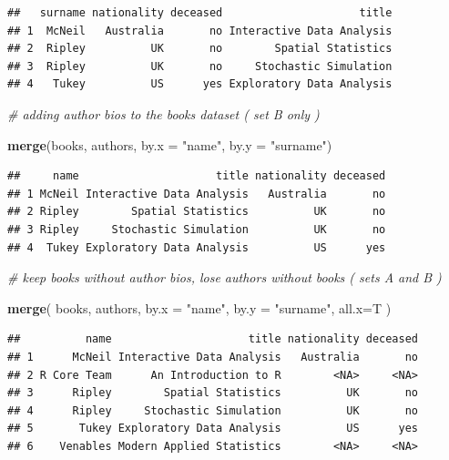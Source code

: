 \documentclass[]{book}
\newenvironment{Shaded}{\begin{snugshade}}{\end{snugshade}}
\newcommand{\CommentTok}[1]{\textcolor[rgb]{0.56,0.35,0.01}{\textit{#1}}}
\newcommand{\DataTypeTok}[1]{\textcolor[rgb]{0.13,0.29,0.53}{#1}}
\newcommand{\KeywordTok}[1]{\textcolor[rgb]{0.13,0.29,0.53}{\textbf{#1}}}
\newcommand{\NormalTok}[1]{#1}
\newcommand{\StringTok}[1]{\textcolor[rgb]{0.31,0.60,0.02}{#1}}
\theoremstyle{definition}
\theoremstyle{definition}
\theoremstyle{definition}
\theoremstyle{remark}
\begin{document}
\begin{verbatim}
##   surname nationality deceased                     title
## 1  McNeil   Australia       no Interactive Data Analysis
## 2  Ripley          UK       no        Spatial Statistics
## 3  Ripley          UK       no     Stochastic Simulation
## 4   Tukey          US      yes Exploratory Data Analysis
\end{verbatim}

\begin{Shaded}
\begin{Highlighting}[]
\CommentTok{# adding author bios to the books dataset  ( set B only )}

\KeywordTok{merge}\NormalTok{(books, authors, }\DataTypeTok{by.x =} \StringTok{"name"}\NormalTok{, }\DataTypeTok{by.y =} \StringTok{"surname"}\NormalTok{)    }
\end{Highlighting}
\end{Shaded}

\begin{verbatim}
##     name                     title nationality deceased
## 1 McNeil Interactive Data Analysis   Australia       no
## 2 Ripley        Spatial Statistics          UK       no
## 3 Ripley     Stochastic Simulation          UK       no
## 4  Tukey Exploratory Data Analysis          US      yes
\end{verbatim}

\begin{Shaded}
\begin{Highlighting}[]
\CommentTok{# keep books without author bios, lose authors without books  ( sets A and B )}

\KeywordTok{merge}\NormalTok{( books, authors, }\DataTypeTok{by.x =} \StringTok{"name"}\NormalTok{, }\DataTypeTok{by.y =} \StringTok{"surname"}\NormalTok{, }\DataTypeTok{all.x=}\NormalTok{T )     }
\end{Highlighting}
\end{Shaded}

\begin{verbatim}
##          name                     title nationality deceased
## 1      McNeil Interactive Data Analysis   Australia       no
## 2 R Core Team      An Introduction to R        <NA>     <NA>
## 3      Ripley        Spatial Statistics          UK       no
## 4      Ripley     Stochastic Simulation          UK       no
## 5       Tukey Exploratory Data Analysis          US      yes
## 6    Venables Modern Applied Statistics        <NA>     <NA>
\end{verbatim}
\end{document}
